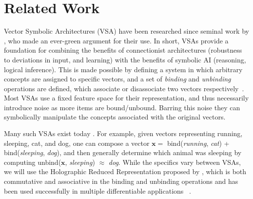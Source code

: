 \documentclass[letterpaper]{article} %
\begin{document}
\section{Related Work} \label{sec:related_work}
Vector Symbolic Architectures (VSA) have been researched since seminal work by \cite{SMOLENSKY1990159}, who made an ever-green argument for their use. In short, VSAs provide a foundation for combining the benefits of connectionist architectures (robustness to deviations in input, and learning) with the benefits of symbolic AI (reasoning, logical inference). This is made possible by defining a system in which arbitrary concepts are assigned to specific vectors, and a set of \textit{binding} and \textit{unbinding} operations are defined, which associate or disassociate two vectors respectively~\cite{Schlegel2021}. Most VSAs use a fixed feature space for their representation, and thus necessarily introduce noise as more items are bound/unbound. Barring this noise they can symbolically manipulate the concepts associated with the original vectors. 
\par 
Many such VSAs exist today \cite{Gosmann:2019:VTB:3334291.3334293, Gayler1998MultiplicativeBR, 10.1162/NECO_a_00467, 10.5555/646256.684603}. %
For example, given vectors representing running, sleeping, cat, and dog, one can compose a vector $\boldsymbol{x} = $ bind(\textit{running}, \textit{cat}) + bind(\textit{sleeping}, \textit{dog}), and then generally determine which animal was sleeping by computing unbind($\boldsymbol{x}$, \textit{sleeping}) $\approx$ \textit{dog}. While the specifics vary between VSAs, we will use the Holographic Reduced Representation proposed by \cite{b2}, which is both commutative and associative in the binding and unbinding operations and has been used successfully in multiple differentiable applications ~\cite{pmlr-v162-alam22a,pmlr-v202-alam23a,pmlr-v187-saul23a,menet2023mimo}.
\end{document}
